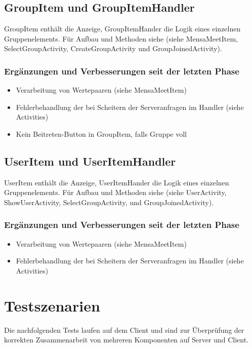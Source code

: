 \documentclass[a4paper]{scrreprt}
\begin{document}
\subsection{GroupItem und GroupItemHandler}
GroupItem enthält die Anzeige, GroupItemHander die Logik eines einzelnen Gruppenelements. 
Für Aufbau und Methoden siehe (siehe MensaMeetItem, SelectGroupActivity, CreateGroupActivity und GroupJoinedActivity). 

\subsubsection{Ergänzungen und Verbesserungen seit der letzten Phase}
\begin{itemize}
\item Verarbeitung von Wertepaaren (siehe MensaMeetItem)
\item Fehlerbehandlung der bei Scheitern der Serveranfragen im Handler (siehe Activities)
\item Kein Beitreten-Button in GroupItem, falls Gruppe voll 

\end{itemize}

\subsection{UserItem und UserItemHandler}
UserItem enthält die Anzeige, UserItemHander die Logik eines einzelnen Gruppenelements. Für Aufbau und Methoden siehe (siehe UserActivity, ShowUserActivity, SelectGroupActivity,  und GroupJoinedActivity). 

\subsubsection{Ergänzungen und Verbesserungen seit der letzten Phase}
\begin{itemize}
\item Verarbeitung von Wertepaaren (siehe MensaMeetItem)
\item Fehlerbehandlung der bei Scheitern der Serveranfragen im Handler (siehe Activities)
\end{itemize}



\section{Testszenarien}

Die nachfolgenden Tests laufen auf dem Client und sind zur Überprüfung der korrekten Zusammenarbeit von mehreren Komponenten auf Server und Client.
\end{document}
